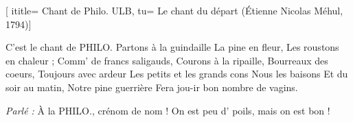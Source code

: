 [
ititle= {Chant de Philo. ULB},
tu= {Le chant du départ (Étienne Nicolas Méhul, 1794)}]

\beginverse
C'est le chant de PHILO.
Partons à la guindaille
La pine en fleur,
Les roustons en chaleur ;
Comm' de francs saligauds,
Courons à la ripaille,
Bourreaux des coeurs,
Toujours avec ardeur
Les petits et les grands cons
Nous les baisons
Et du soir au matin,
Notre pine guerrière
Fera jou-ir bon nombre de vagins.
\endverse

\beginverse
\textit {Parlé :}
À la PHILO., crénom de nom !
On est peu d' poils, mais on est bon !
\endverse

\endsong
